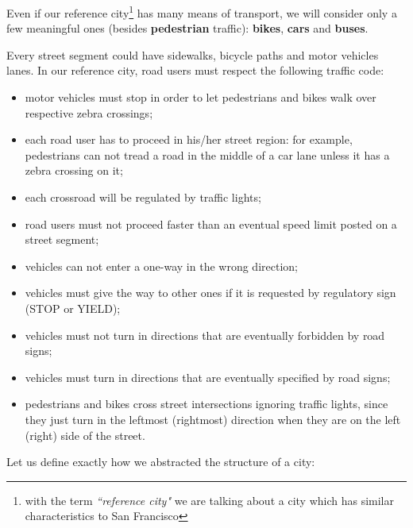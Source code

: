 Even if our reference city\footnote{with the term \emph{``reference city"}
we are talking about a city which has similar characteristics to San
Francisco} has many means of transport, we will consider only a few meaningful
ones (besides \textbf{pedestrian} traffic): \textbf{bikes}, \textbf{cars} and
\textbf{buses}.

Every street segment could have sidewalks, bicycle paths and motor vehicles
lanes. In our reference city, road users must respect the following traffic
code:

\begin{itemize}
\item motor vehicles must stop in order to let pedestrians and bikes walk over
  respective zebra crossings;
\item each road user has to proceed in his/her street region: for example,
  pedestrians can not tread a road in the middle of a car lane unless it has a
  zebra crossing on it;
\item each crossroad will be regulated by traffic lights;
\item road users must not proceed faster than an eventual speed limit posted
  on a street segment;
\item vehicles can not enter a one-way in the wrong direction;
\item vehicles must give the way to other ones if it is requested by
  regulatory sign (STOP or YIELD);
\item vehicles must not turn in directions that are eventually forbidden by
  road signs;
\item vehicles must turn in directions that are eventually specified by road
  signs;
\item pedestrians and bikes cross street intersections ignoring traffic lights,
  since they just turn in the leftmost (rightmost) direction when they are on
  the left (right) side of the street.
\end{itemize}

Let us define exactly how we abstracted the structure of a city:

